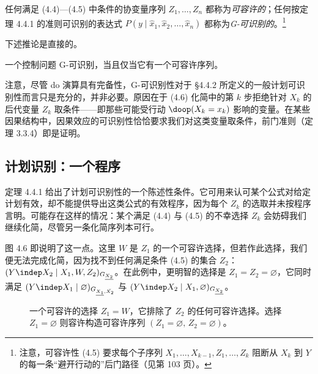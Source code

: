 \begin{definition}
任何满足 \textup{(4.4)}—\textup{(4.5)} 中条件的协变量序列 $Z_1,\dots,Z_n$ 都称为\emph{可容许的}；任何按定理 4.4.1 的准则可识别的表达式 $P(y\mid\hat{x}_1,\hat{x}_2,\dots,\hat{x}_n)$ 都称为\emph{G-可识别的}。\footnote{注意，可容许性 \textup{(4.5)} 要求每个子序列 $X_1,\dots,X_{k-1},Z_1,\dots,Z_k$ 阻断从 $X_k$ 到 $Y$ 的每一条“避开行动的”后门路径（见第 103 页）。}
\end{definition}

下述推论是直接的。

\begin{corollary}
一个控制问题 G-可识别，当且仅当它有一个可容许序列。
\end{corollary}

注意，尽管 do 演算具有完备性，G-可识别性对于 \S 4.4.2 所定义的一般计划可识别性而言只是充分的，并非必要。原因在于 \textup{(4.6)} 化简中的第 $k$ 步拒绝针对 $X_k$ 的后代变量 $Z_k$ 取条件——即那些可能受行动 $\doop(X_k=x_k)$ 影响的变量。在某些因果结构中，因果效应的可识别性恰恰要求我们对这类变量取条件，前门准则（定理 3.3.4）即是证明。

\subsection{计划识别：一个程序}

定理 4.4.1 给出了计划可识别性的一个陈述性条件。它可用来认可某个公式对给定计划有效，却不能提供导出这类公式的有效程序，因为每个 $Z_k$ 的选取并未按程序言明。可能存在这样的情况：某个满足 \textup{(4.4)} 与 \textup{(4.5)} 的不幸选择 $Z_k$ 会妨碍我们继续化简，尽管另一条化简序列本可行。

图 4.6 即说明了这一点。这里 $W$ 是 $Z_1$ 的一个可容许选择，但若作此选择，我们便无法完成化简，因为找不到任何满足条件 \textup{(4.5)} 的集合 $Z_2$：$(Y\indep X_2\mid X_1,W,Z_2)_{G_{\underline{X_2}}}$。在此例中，更明智的选择是 $Z_1=Z_2=\varnothing$，它同时满足 $(Y\indep X_1\mid\varnothing)_{G_{\underline{X_1},\bar{X_2}}}$ 与 $(Y\indep X_2\mid X_1,\varnothing)_{G_{\underline{X_2}}}$。

\begin{figure}[htbp]
\centering
{}
\caption{一个可容许的选择 $Z_1=W$，它排除了 $Z_2$ 的任何可容许选择。选择 $Z_1=\varnothing$ 则容许构造可容许序列 $(Z_1=\varnothing,\,Z_2=\varnothing)$。}
\label{fig:4.6}
\end{figure}

